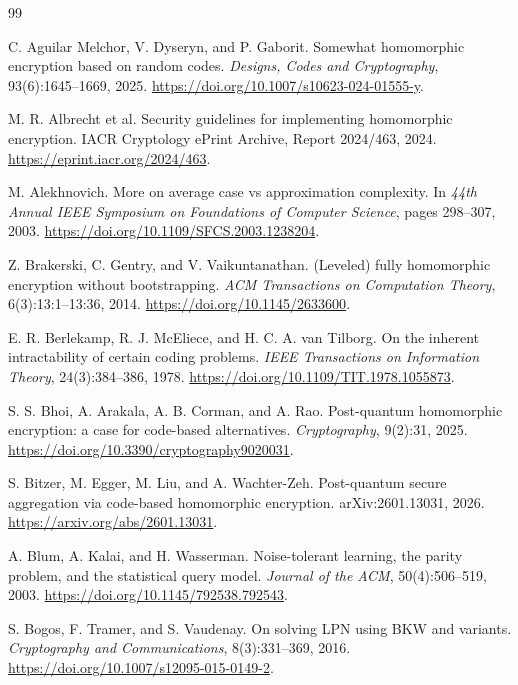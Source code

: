 \begin{thebibliography}{99}

C. Aguilar Melchor, V. Dyseryn, and P. Gaborit.
Somewhat homomorphic encryption based on random codes.
\emph{Designs, Codes and Cryptography}, 93(6):1645--1669, 2025.
\url{https://doi.org/10.1007/s10623-024-01555-y}.

M. R. Albrecht et al.
Security guidelines for implementing homomorphic encryption.
IACR Cryptology ePrint Archive, Report 2024/463, 2024.
\url{https://eprint.iacr.org/2024/463}.

M. Alekhnovich.
More on average case vs approximation complexity.
In \emph{44th Annual IEEE Symposium on Foundations of Computer Science}, pages 298--307, 2003.
\url{https://doi.org/10.1109/SFCS.2003.1238204}.

Z. Brakerski, C. Gentry, and V. Vaikuntanathan.
(Leveled) fully homomorphic encryption without bootstrapping.
\emph{ACM Transactions on Computation Theory}, 6(3):13:1--13:36, 2014.
\url{https://doi.org/10.1145/2633600}.

E. R. Berlekamp, R. J. McEliece, and H. C. A. van Tilborg.
On the inherent intractability of certain coding problems.
\emph{IEEE Transactions on Information Theory}, 24(3):384--386, 1978.
\url{https://doi.org/10.1109/TIT.1978.1055873}.

S. S. Bhoi, A. Arakala, A. B. Corman, and A. Rao.
Post-quantum homomorphic encryption: a case for code-based alternatives.
\emph{Cryptography}, 9(2):31, 2025.
\url{https://doi.org/10.3390/cryptography9020031}.

S. Bitzer, M. Egger, M. Liu, and A. Wachter-Zeh.
Post-quantum secure aggregation via code-based homomorphic encryption.
arXiv:2601.13031, 2026.
\url{https://arxiv.org/abs/2601.13031}.

A. Blum, A. Kalai, and H. Wasserman.
Noise-tolerant learning, the parity problem, and the statistical query model.
\emph{Journal of the ACM}, 50(4):506--519, 2003.
\url{https://doi.org/10.1145/792538.792543}.

S. Bogos, F. Tramer, and S. Vaudenay.
On solving LPN using BKW and variants.
\emph{Cryptography and Communications}, 8(3):331--369, 2016.
\url{https://doi.org/10.1007/s12095-015-0149-2}.


\end{thebibliography}
